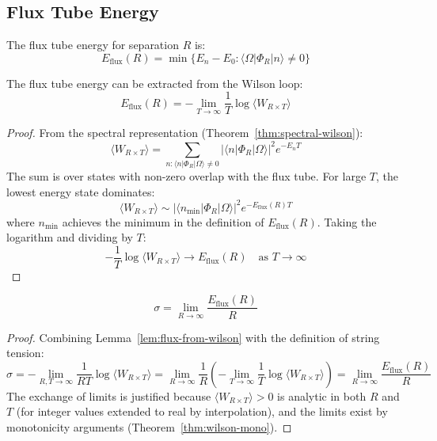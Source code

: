 \subsection{Flux Tube Energy}
\label{sec:flux-tube}

\begin{definition}
The flux tube energy for separation $R$ is:
\[
E_{\text{flux}}(R) = \min\{E_n - E_0 : \langle \Omega | \Phi_R | n \rangle \neq 0\}
\]
\end{definition}

\begin{lemma}
\label{lem:flux-from-wilson}
The flux tube energy can be extracted from the Wilson loop:
\[
E_{\text{flux}}(R) = -\lim_{T \to \infty} \frac{1}{T} \log \langle W_{R \times T} \rangle
\]
\end{lemma}

\begin{proof}
From the spectral representation (Theorem~\ref{thm:spectral-wilson}):
\[
\langle W_{R \times T} \rangle = \sum_{n : \langle n|\Phi_R|\Omega\rangle \neq 0} 
|\langle n | \Phi_R | \Omega \rangle|^2 e^{-E_n T}
\]
The sum is over states with non-zero overlap with the flux tube. For large $T$, 
the lowest energy state dominates:
\[
\langle W_{R \times T} \rangle \sim |\langle n_{\min} | \Phi_R | \Omega \rangle|^2 
e^{-E_{\text{flux}}(R) T}
\]
where $n_{\min}$ achieves the minimum in the definition of $E_{\text{flux}}(R)$.
Taking the logarithm and dividing by $T$:
\[
-\frac{1}{T}\log\langle W_{R \times T}\rangle \to E_{\text{flux}}(R) \quad \text{as } T \to \infty
\]
\end{proof}

\begin{lemma}
\label{lem:sigma-flux}
\[
\sigma = \lim_{R \to \infty} \frac{E_{\text{flux}}(R)}{R}
\]
\end{lemma}

\begin{proof}
Combining Lemma~\ref{lem:flux-from-wilson} with the definition of string tension:
\[
\sigma = -\lim_{R,T \to \infty} \frac{1}{RT}\log\langle W_{R \times T}\rangle 
= \lim_{R \to \infty} \frac{1}{R}\left(-\lim_{T \to \infty} \frac{1}{T}\log\langle W_{R \times T}\rangle\right)
= \lim_{R \to \infty} \frac{E_{\text{flux}}(R)}{R}
\]
The exchange of limits is justified because $\langle W_{R \times T}\rangle > 0$ 
is analytic in both $R$ and $T$ (for integer values extended to real by interpolation), 
and the limits exist by monotonicity arguments (Theorem~\ref{thm:wilson-mono}).
\end{proof}

